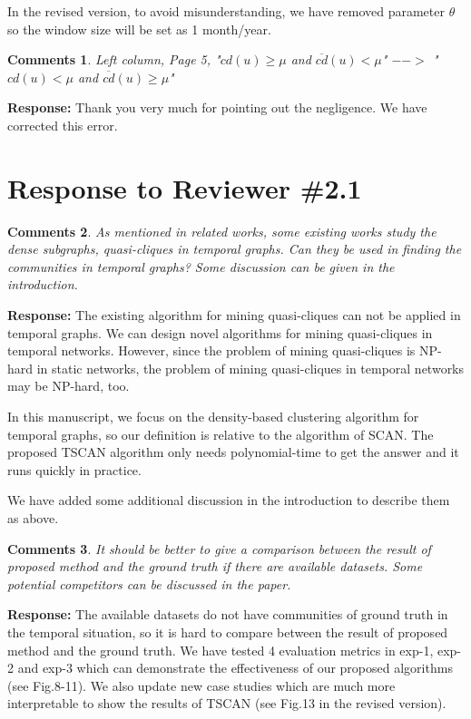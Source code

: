 \documentclass{article}
\newtheorem{Comments}{\textbf{Comments}}
\begin{document}
In the revised version, to avoid misunderstanding, we have removed parameter $\theta$ so the window size will be set as 1 month/year.

\begin{Comments}
 Left column, Page 5, "$cd(u) \geq \mu$ and $\overline{cd}(u) < \mu$" $-->$ "$cd(u) < \mu$ and $\overline{cd}(u) \geq \mu$"
\end{Comments}
\noindent \textbf{Response: } Thank you very much for pointing out the negligence. We have corrected this error.



\section{Response to Reviewer \#2.1}
\setcounter{Comments}{0}
\begin{Comments}
As mentioned in related works, some existing works study the dense subgraphs, quasi-cliques in temporal graphs. Can they be used in finding the communities in temporal graphs? Some discussion can be given in the introduction.
\end{Comments}
\noindent \textbf{Response: }
The existing algorithm for mining quasi-cliques can not be applied in temporal graphs. We can design novel algorithms for mining quasi-cliques in temporal networks. However, since the problem of mining quasi-cliques is NP-hard in static networks, the problem of mining quasi-cliques in temporal networks may be NP-hard, too.

In this manuscript, we focus on the density-based clustering algorithm for temporal graphs, so our definition is relative to the algorithm of SCAN. The proposed TSCAN algorithm only needs polynomial-time to get the answer and it runs quickly in practice.

We have added some additional discussion in the introduction to describe them as above. 

\begin{Comments}
It should be better to give a comparison between the result of proposed method and the ground truth if there are available datasets.
Some potential competitors can be discussed in the paper.
\end{Comments}
\noindent \textbf{Response: } The available datasets do not have communities of ground truth in the temporal situation, so it is hard to compare  between the result of proposed method and the ground truth. We have tested 4 evaluation metrics in exp-1, exp-2 and exp-3 which can demonstrate the effectiveness of our proposed algorithms (see Fig.8-11). We also update new case studies which are much more interpretable to show the results of TSCAN (see Fig.13 in the revised version).
\end{document}
